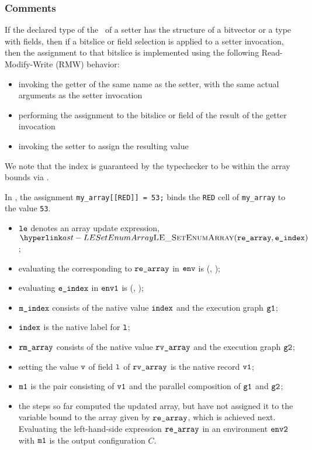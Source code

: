 \subsubsection{Comments}
If the declared type of the \rhsexpression\ of a setter has the structure of a
bitvector or a type with fields, then if a bitslice or field selection is
applied to a setter invocation, then the assignment to that bitslice is
implemented using the following Read-Modify-Write (RMW) behavior:
\begin{itemize}
\item invoking the getter of the same name as the setter, with the same actual
arguments as the setter invocation
\item performing the assignment to the bitslice or field of the result of the
getter invocation
\item invoking the setter to assign the resulting value
\end{itemize}

We note that the index is guaranteed by the typechecker to be within the array bounds
via .

In , the assignment \verb|my_array[[RED]] = 53;| binds the \verb|RED|
cell of
\texttt{my\_array} to the value \texttt{53}.

\ProseParagraph
\AllApply
\begin{itemize}
  \item $\texttt{le}$ denotes an array update expression, $\LESetEnumArray(\rearray, \eindex)$;
  \item evaluating the \rhsexpression{} corresponding to $\texttt{re\_array}$ in $\texttt{env}$
  is \ResultExpr(\rmarray, \envone)\ProseOrAbnormal;
  \item evaluating $\texttt{e\_index}$ in $\texttt{env1}$ is \ResultExpr(\mindex, \envtwo)\ProseOrAbnormal;
  \item $\texttt{m\_index}$ consists of the native value $\texttt{index}$ and the execution graph $\texttt{g1}$;
  \item $\texttt{index}$ is the native label for $\texttt{l}$;
  \item $\texttt{rm\_array}$ consists of the native value $\texttt{rv\_array}$ and the execution graph $\texttt{g2}$;
  \item setting the value $\texttt{v}$ of field $\texttt{l}$ of $\texttt{rv\_array}$ is the native record $\texttt{v1}$;
  \item $\texttt{m1}$ is the pair consisting of $\texttt{v1}$ and the parallel composition of $\texttt{g1}$ and $\texttt{g2}$;
  \item the steps so far computed the updated array, but have not assigned it to the variable
  bound to the array given by $\texttt{re\_array}$, which is achieved next.
  Evaluating the left-hand-side expression $\texttt{re\_array}$ in an environment $\texttt{env2}$ with $\texttt{m1}$
  is the output configuration $C$.
\end{itemize}

